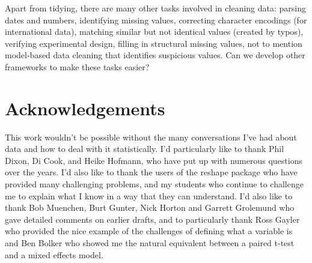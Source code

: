 \documentclass[article]{jss}
\begin{document}
Apart from tidying, there are many other tasks involved in cleaning data: parsing dates and numbers, identifying missing values, correcting character encodings (for international data), matching similar but not identical values (created by typos), verifying experimental design, filling in structural missing values, not to mention model-based data cleaning that identifies suspicious values. Can we develop other frameworks to make these tasks easier?


\section{Acknowledgements} 
\label{sec:acknowledgements}

This work wouldn't be possible without the many conversations I've had about data and how to deal with it statistically. I'd particularly like to thank Phil Dixon, Di Cook, and Heike Hofmann, who have put up with numerous questions over the years. I'd also like to thank the users of the reshape package who have provided many challenging problems, and my students who continue to challenge me to explain what I know in a way that they can understand. I'd also like to thank Bob Muenchen, Burt Gunter, Nick Horton and Garrett Grolemund who gave detailed comments on earlier drafts, and to particularly thank Ross Gayler who provided the nice example of the challenges of defining what a variable is and Ben Bolker who showed me the natural equivalent between a paired t-test and a mixed effects model.


\end{document}
